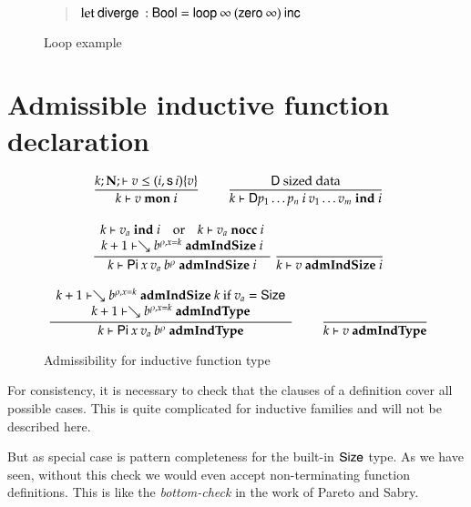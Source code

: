 \begin{figure}
\begin{quote}
$\mathrm{let}\: \mathsf{diverge}\: : \mathsf{Bool} = \mathsf{loop}\: \infty\: (\mathsf{zero}\: \infty) \: \mathsf{inc}\:$
\end{quote}
\caption{Loop example}
\label{loop}
\end{figure}


\newcommand{\mon}[3]{#1\vdash#2\mbox{ \textbf{mon} }#3}
\newcommand{\indu}[3]{#1\vdash#2\mbox{ \textbf{ind} }#3}
\newcommand{\coind}[3]{#1\vdash#2\mbox{ \textbf{coind} }#3}
\newcommand{\admIndSize}[3]{#1\vdash#2\mbox{ \textbf{admIndSize} }#3}
\newcommand{\admCoSize}[3]{#1\vdash#2\mbox{ \textbf{admCoSize} }#3}
\newcommand{\admIndType}[2]{#1\vdash#2\mbox{ \textbf{admIndType}}}
\newcommand{\admCoType}[2]{#1\vdash#2\mbox{ \textbf{admCoType}}}

\newcommand{\sizePat}[1]{\vdash#1\mbox{ \textbf{sizePat}}}
\newcommand{\sizePats}[1]{\vdash#1\mbox{ \textbf{sizePats}}}

\section{Admissible inductive function declaration}

\begin{figure}
\begin{gather*}
\nru{}
{\LeqVal{k}{\nF}{v}{\subst{(i,\s i)}{v}}}
{\mon{k}{v}{i}}
\qquad
\nru{}
{\DD \mbox{ sized data}}
{\indu{k}{\DD p_1 \ldots p_n \: i \: v_1 \ldots v_m}{i}}
\\[2ex]
\ndru{}
{\indu{k}{v_a}{i} \quad \mbox{or} \quad \nocc{k}{v_a}{i}}
{\admIndSize{k+1}{\wh \cl{b}{\ins{\rho}{x}{k}}}{i}}
{\admIndSize{k}{\vpi \: x \: v_a \: \cl{b}{\rho}}{i}}
\nru{}
{}
{\admIndSize{k}{v}{i}}
\\[2ex]
\ndru{}
{\admIndSize{k+1}{\wh \cl{b}{\ins{\rho}{x}{k}}}{k} \mbox{ if } v_a = \Size}
{\admIndType{k+1}{\wh \cl{b}{\ins{\rho}{x}{k}}}}
{\admIndType{k}{\vpi \: x \: v_a \: \cl{b}{\rho}}}
\qquad
\nru{}
{}
{\admIndType{k}{v}}
\end{gather*}
\caption{Admissibility for inductive function type}
\end{figure}

For consistency, it is necessary to check that the clauses of a definition cover all possible cases.
This is quite complicated \cite{norell:thesis,schurmann03coverage} for inductive families and will not be described here.

But as special case is pattern completeness for the built-in $\mathsf{Size}$ type.
As we have seen, without this check we would even accept non-terminating function definitions.
This is like the \emph{bottom-check} in the work of Pareto and Sabry.

